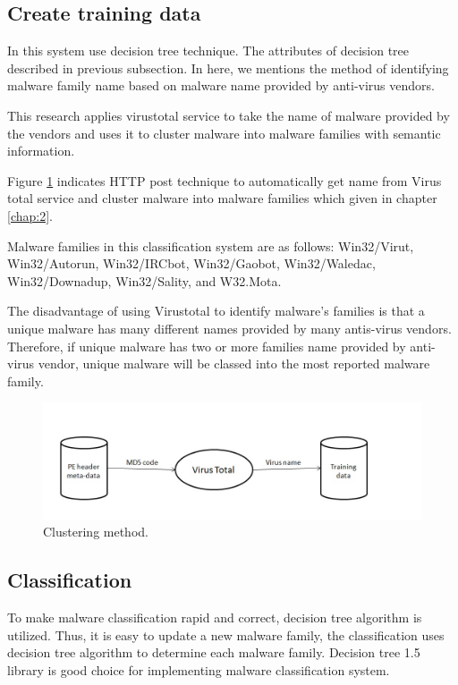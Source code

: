\subsection{Create training data}

In this system use decision tree technique. The attributes of decision tree described in previous subsection. In here, we mentions the method of identifying malware family name based on malware name provided by anti-virus vendors.

This research applies virustotal service to take the name of malware provided by the vendors and uses it to cluster malware into malware families with semantic information.

Figure \ref{fig:clustering} indicates HTTP post technique to automatically get name from Virus total service and cluster malware into malware families which given in chapter \ref{chap:2}.

Malware families in this classification system are as follows: Win32/Virut, Win32/Autorun, Win32/IRCbot, Win32/Gaobot, Win32/Waledac, Win32/Downadup, Win32/Sality, and W32.Mota. 

The disadvantage of using Virustotal to identify malware's families is that a unique malware has many different names provided by many antis-virus vendors. Therefore, if unique malware has two or more families name provided by anti-virus vendor, unique malware will be classed into the most reported malware family.
\begin{figure}[h!]
\centering
\includegraphics[width=1\textwidth]{graph/clustering.jpg}
\caption{Clustering method.}
\label{fig:clustering}
\end{figure}

\subsection{Classification}

To make malware classification rapid and correct, decision tree algorithm is utilized. Thus, it is easy to update a new malware family, the classification uses decision tree algorithm to determine each malware family. 
Decision tree 1.5 library is good choice for implementing malware classification system.  


